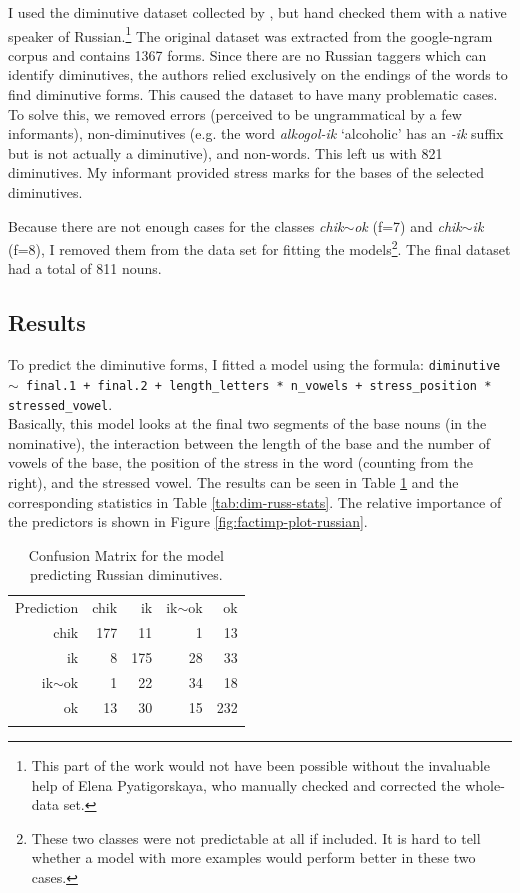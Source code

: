 I used the diminutive dataset collected by \textcite{Gouskova.2015}, but hand checked them with a native speaker of Russian.\footnote{This part of the work would not have been possible without the invaluable help of Elena Pyatigorskaya, who manually checked and corrected the whole-data set.} The original dataset was extracted from the google-ngram corpus \autocite{Michel.2011} and contains 1367 forms. Since there are no Russian taggers which can identify diminutives, the authors relied exclusively on the endings of the words to find diminutive forms. This caused the dataset to have many problematic cases. To solve this, we removed errors (perceived to be ungrammatical by a few informants), non-diminutives (e.g. the word \textit{alkogol-ik} `alcoholic' has an \textit{-ik} suffix but is not actually a diminutive), and non-words. This left us with 821 diminutives. My informant provided stress marks for the bases of the selected diminutives.

Because there are not enough cases for the classes \textit{chik$\sim$ok} (f=7) and \textit{chik$\sim$ik} (f=8), I removed them from the data set for fitting the models\footnote{These two classes were not predictable at all if included. It is hard to tell whether a model with more examples would perform better in these two cases.}. The final dataset had a total of 811 nouns.

\subsection{Results}

To predict the diminutive forms, I fitted a model using the formula: \texttt{diminutive $\sim$ final.1 + final.2 + length\_letters * n\_vowels + stress\_position * stressed\_vowel}. \\Basically, this model looks at the final two segments of the base nouns (in the nominative), the interaction between the length of the base and the number of vowels of the base, the position of the stress in the word (counting from the right), and the stressed vowel. The results can be seen in Table \ref{tab:dim-russ} and the corresponding statistics in Table \ref{tab:dim-russ-stats}. The relative importance of the predictors is shown in Figure \ref{fig:factimp-plot-russian}.

\begin{table}[!htpb]
  \centering
  \begin{tabular}{rrrrr}
    \lsptoprule
    \multicolumn{5}{c}{Reference}               \\
    \midrule
    Prediction  & chik & ik  & ik$\sim$ok & ok  \\
     chik       & 177  & 11  & 1          & 13  \\
     ik         & 8    & 175 & 28         & 33  \\
     ik$\sim$ok & 1    & 22  & 34         & 18  \\
     ok         & 13   & 30  & 15         & 232 \\
    \lspbottomrule
  \end{tabular}
  \caption{Confusion Matrix for the model predicting Russian diminutives.}\label{tab:dim-russ}
\end{table}

